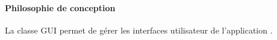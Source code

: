 \paragraph{Philosophie de conception}
La classe GUI permet de gérer les interfaces utilisateur de l'application {\nomApplication}.\\